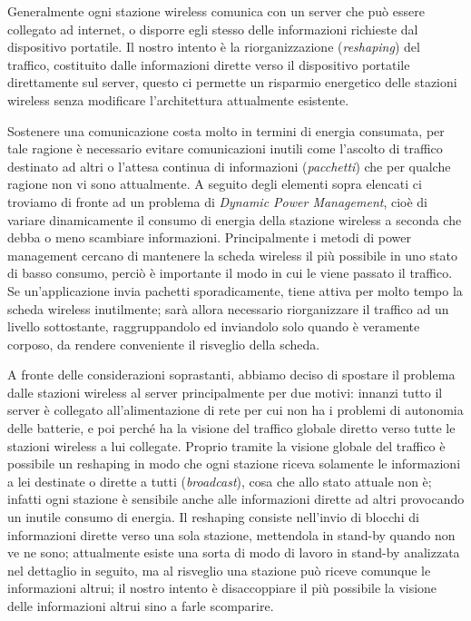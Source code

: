 Generalmente ogni stazione wireless comunica con un server che pu\`o essere collegato ad internet, o
disporre egli stesso delle informazioni richieste dal dispositivo portatile. Il nostro intento \`e la
riorganizzazione ({\em reshaping}) del traffico, costituito dalle informazioni dirette verso il dispositivo
portatile direttamente sul server, questo ci permette un risparmio energetico delle stazioni wireless senza
modificare l'architettura attualmente esistente.

Sostenere una comunicazione costa molto in termini di energia consumata, per tale ragione \`e necessario
evitare comunicazioni inutili come l'ascolto di traffico destinato ad altri o l'attesa continua di
informazioni ({\em pacchetti}) che per qualche ragione non vi sono attualmente. A seguito degli elementi
sopra elencati ci troviamo di fronte ad un problema di {\em Dynamic Power Management}, cio\`e di variare
dinamicamente il consumo di energia della stazione wireless a seconda che debba o meno scambiare
informazioni. Principalmente i metodi di power management cercano di mantenere la scheda wireless il pi\`u
possibile in uno stato di basso consumo, perci\`o \`e importante il modo in cui le viene passato il
traffico. Se un'applicazione invia pachetti sporadicamente, tiene attiva per molto tempo la scheda
wireless inutilmente; sar\`a allora necessario riorganizzare il traffico ad un livello sottostante,
raggruppandolo ed inviandolo solo quando \`e veramente corposo, da rendere conveniente il risveglio della
scheda.

A fronte delle considerazioni soprastanti, abbiamo deciso di spostare il problema dalle stazioni wireless al
server principalmente per due motivi: innanzi tutto il server \`e collegato all'alimentazione di rete per
cui non ha i problemi di autonomia delle batterie, e poi perch\'e ha la visione del traffico globale diretto
verso tutte le stazioni wireless a lui collegate. Proprio tramite la visione globale del traffico \`e
possibile un reshaping in modo che ogni stazione riceva solamente le informazioni a lei destinate o dirette
a tutti ({\em broadcast}), cosa che allo stato attuale non \`e; infatti ogni stazione \`e sensibile anche
alle informazioni dirette ad altri provocando un inutile consumo di energia.  Il reshaping consiste
nell'invio di blocchi di informazioni dirette verso una sola stazione, mettendola in stand-by quando non ve
ne sono; attualmente esiste una sorta di modo di lavoro in stand-by analizzata nel dettaglio in seguito, ma
al risveglio una stazione pu\`o riceve comunque le informazioni altrui; il nostro intento \`e disaccoppiare
il pi\`u possibile la visione delle informazioni altrui sino a farle scomparire.

